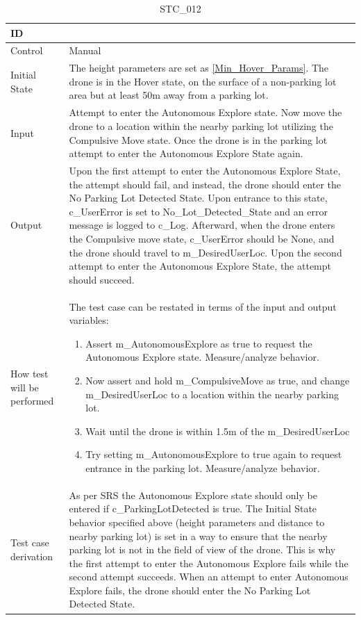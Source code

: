 \documentclass[12pt, titlepage]{article}
\begin{document}
\begin{table}[!h]
\begin{center}
\caption {STC\_012}
\label{tab:STC_012}
\begin{tabular}{ | m{1.5cm} | m{15cm} | } 
\hline
ID & \nameref{tab:STC_012} \\ 
\hline
Control & Manual \\ 
\hline
Initial State & The height parameters are set as \ref{Min_Hover_Params}. The drone is in the Hover state, on the surface of a non-parking lot area but at least 50m away from a parking lot.  \\ 
\hline
Input & Attempt to enter the Autonomous Explore state. Now move the drone to a location within the nearby parking lot utilizing the Compulsive Move state. Once the drone is in the parking lot attempt to enter the Autonomous Explore State again. \\ 
\hline
Output & Upon the first attempt to enter the Autonomous Explore State, the attempt should fail, and instead, the drone should enter the No Parking Lot Detected State. Upon entrance to this state, c\_UserError is set to No_Lot_Detected_State and an error message is logged to c\_Log. Afterward, when the drone enters the Compulsive move state, c\_UserError should be None, and the drone should travel to m\_DesiredUserLoc. Upon the second attempt to enter the Autonomous Explore State, the attempt should succeed. \\ 
\hline
How test will be performed & 
The test case can be restated in terms of the input and output variables: 
\begin{enumerate}[topsep=0pt,itemsep=-1ex,partopsep=1ex,parsep=1ex]
	\item Assert m\_AutonomousExplore as true to request the Autonomous Explore state. Measure/analyze behavior. 
	\item Now assert and hold m\_CompulsiveMove as true, and change m\_DesiredUserLoc to a location within the nearby parking lot. 
	\item Wait until the drone is within 1.5m of the m\_DesiredUserLoc
	\item Try setting m\_AutonomousExplore to true again to request entrance in the parking lot. Measure/analyze behavior.  \end{enumerate} \\
\hline
Test case derivation & As per SRS the Autonomous Explore state should only be entered if c\_ParkingLotDetected is true. The Initial State behavior specified above (height parameters and distance to nearby parking lot) is set in a way to ensure that the nearby parking lot is not in the field of view of the drone. This is why the first attempt to enter the Autonomous Explore fails while the second attempt succeeds. When an attempt to enter Autonomous Explore fails, the drone should enter the No Parking Lot Detected State.


\end{tabular}
\end{center}
\end{table}
\end{document}
